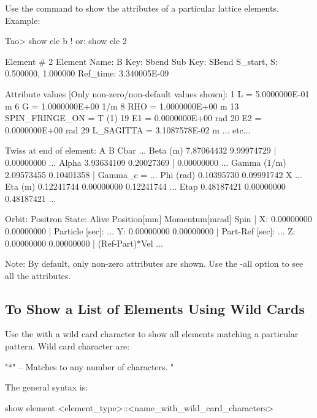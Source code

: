 \documentclass{hitec}
\begin{document}
Use the  command to show the attributes of a particular lattice elements. Example:
\begin{code} 
Tao> show ele b   ! or: show ele 2

 Element #                2
 Element Name: B
 Key: Sbend
 Sub Key: SBend
 S_start, S:    0.500000,    1.000000
 Ref_time:  3.340005E-09

 Attribute values [Only non-zero/non-default values shown]:
    1   L                            =  5.0000000E-01 m
    6   G                            =  1.0000000E+00 1/m
    8   RHO                          =  1.0000000E+00 m
   13   SPIN_FRINGE_ON               =  T (1)
   19   E1                           =  0.0000000E+00 rad
   20   E2                           =  0.0000000E+00 rad
   29   L_SAGITTA                    =  3.1087578E-02 m
     ... etc...

Twiss at end of element:
                          A              B            Cbar    ...
  Beta (m)         7.87064432     9.99974729  |   0.00000000  ...
  Alpha            3.93634109     0.20027369  |   0.00000000  ...
  Gamma (1/m)      2.09573455     0.10401358  |   Gamma_c =   ...
  Phi (rad)        0.10395730     0.09991742            X     ...
  Eta (m)          0.12241744     0.00000000     0.12241744   ...
  Etap             0.48187421     0.00000000     0.48187421   ...

Orbit:  Positron   State: Alive
         Position[mm] Momentum[mrad]        Spin   |
  X:       0.00000000     0.00000000               | Particle [sec]: ...
  Y:       0.00000000     0.00000000               | Part-Ref [sec]: ...
  Z:       0.00000000     0.00000000               | (Ref-Part)*Vel  ...
\end{code}
Note: By default, only non-zero attributes are shown. Use the -all option to see all the attributes.

\subsection{To Show a List of Elements Using Wild Cards}

Use the  with a wild card character to show all elements matching a particular
pattern. Wild card character are:
\begin{code}
"*" -- Matches to any number of characters.
"%
\end{code}
The general syntax is:
\begin{code}
show element <element_type>::<name_with_wild_card_characters>
\end{code}
\end{document}
